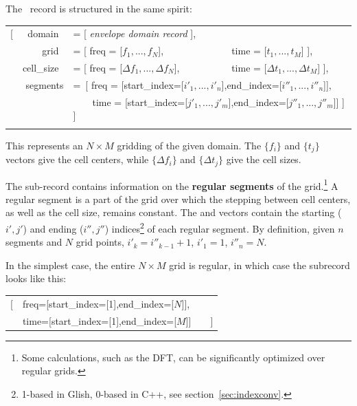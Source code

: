  The \Cells\ record is structured in the same spirit:
  
  {\tt\begin{center}\begin{tabular}{lrl@{}l}
  [ &domain~&     = [ {\em envelope domain record} ],\\
    &grid~&       = [ freq = [$f_1,...,f_N$],~&~time = [$t_1,...,t_M$] ],\\
    &cell\_size~& = [ freq = [$\Delta f_1,...,\Delta f_N$],~&~time = 
                              [$\Delta t_1,...,\Delta t_M$] ],\\
    &segments&\multicolumn{2}{l}{=~[ freq =
    [start\_index=[$i'_1,...,i'_n$],end\_index=[$i''_1,...,i''_n$]],}\\
              &&\multicolumn{2}{l}{~~~~time =
              [start\_index=[$j'_1,...,j'_m$],end\_index=[$j''_1,...,j''_m$]] ] ]}\\
  \\ 
  \end{tabular}\end{center}}
  
  This represents an $N\times M$ gridding of the given domain. The $\{f_i\}$ and
  $\{t_j\}$ vectors give the cell centers, while $\{\Delta f_i\}$ and $\{\Delta
  t_j\}$ give the cell sizes. 
  
  The  sub-record contains information on the {\bf regular
  segments} of the grid.\footnote{Some calculations, such as the DFT, can be
  significantly optimized over regular grids.} A regular segment is a part of
  the grid over which the stepping between cell centers, as well as the cell
  size, remains constant. The  and  vectors
  contain the starting ($i',j'$) and ending ($i'',j''$)
  indices\footnote{1-based in Glish, 0-based in C++, see
  section~\ref{sec:indexconv}.} of each regular segment.
  By definition, given $n$ segments and $N$ grid points, $i'_{k}= i''_{k-1}+1$,
  $i'_1=1$, $i''_n=N.$

  In the simplest case, the entire $N\times M$ grid is regular, in which case the
   subrecord looks like this:
 
  {\tt\begin{center}\begin{tabular}{ll}
  [&freq=[start\_index=[1],end\_index=[$N$]],\\
  &time=[start\_index=[1],end\_index=[$M$]]~~~~]\\
  \end{tabular}\end{center}}
  
